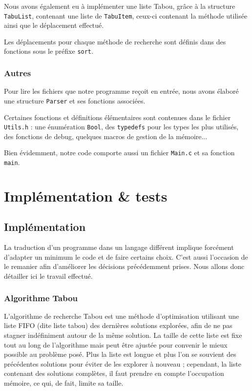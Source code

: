\documentclass[hideweeklyreports]{polytech/polytech}
\newcommand{\codec}[1]{\texttt{#1}}
\begin{document}
				Nous avons également eu à implémenter une liste Tabou, grâce à la structure \codec{TabuList}, contenant une liste de \codec{TabuItem}, ceux-ci contenant la méthode utilisée ainsi que le déplacement effectué.
				
				Les déplacements pour chaque méthode de recherche sont définis dans des fonctions sous le préfixe \codec{sort}.

			\subsection{Autres}
				Pour lire les fichiers que notre programme reçoit en entrée, nous avons élaboré une structure \codec{Parser} et ses fonctions associées.
				
				Certaines fonctions et définitions élémentaires sont contenues dans le fichier \codec{Utils.h} : une énumération \codec{Bool}, des \codec{typedefs} pour les types les plus utilisés, des fonctions de debug, quelques macros de gestion de la mémoire...
				
				Bien évidemment, notre code comporte aussi un fichier \codec{Main.c} et sa fonction \codec{main}.

		
	\chapter{Implémentation \& tests}
		\section{Implémentation}
			La traduction d'un programme dans un langage différent implique forcément d'adapter un minimum le code et de faire certains choix. C'est aussi l'occasion de le remanier afin d'améliorer les décisions précédemment prises. Nous allons donc détailler ici le travail effectué.
			
			\subsection{Algorithme Tabou}
				L'algorithme de recherche Tabou est une méthode d'optimisation utilisant une liste FIFO (dite liste tabou) des dernières solutions explorées, afin de ne pas stagner indéfiniment autour de la même solution. La taille de cette liste est fixe tout au long de l'algorithme mais peut être ajustée pour convenir le mieux possible au problème posé. Plus la liste est longue et plus l'on se souvient des précédentes solutions pour éviter de les explorer à nouveau ; cependant, la liste contenant des solutions complètes, il faut prendre en compte l'occupation mémoire, ce qui, de fait, limite sa taille.
				
\end{document}
